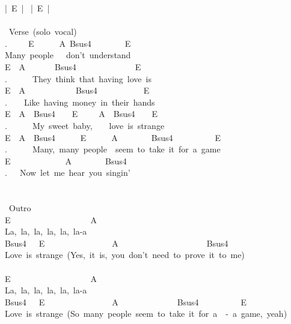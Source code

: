 {|\ E\ |\ %
|\ E\ |\ %
\\
\\
\lbrack\ Verse\rbrack\ (solo\ vocal)\\
.\ \ \ \ \ E\ \ \ \ \ \ A\ Bsus4\ \ \ \ \ \ \lbrack\ \ E\ \rbrack\\
Many\ people\ \ \ don't\ understand\\
E\ \ A\ \ \ \ \ \ \ Bsus4\ \ \ \ \ \ \ \ \ \ \ \ \lbrack\ \ E\ \rbrack\\
.\ \ \ \ \ \ They\ think\ that\ having\ love\ is\ \\
E\ \ A\ \ \ \ \ \ \ \ \ \ \ \ Bsus4\ \ \ \ \ \ \ \ \ \lbrack\ \ E\ \rbrack\\
.\ \ \ \ Like\ having\ money\ in\ their\ hands\\
E\ \ A\ \ Bsus4\ \ \ \ E\ \ \ \ \ A\ \ Bsus4\ \ \lbrack\ \ E\ \rbrack\\
.\ \ \ \ \ \ My\ sweet\ baby,\ \ \ \ love\ is\ strange\\
E\ \ A\ \ Bsus4\ \ \ \ \ \ E\ \ \ \ \ \ A\ \ \ \ \ \ \ \ Bsus4\ \ \ \ \ \ \ \ \lbrack\ \ E\ \rbrack\\
.\ \ \ \ \ \ Many,\ many\ people\ \ seem\ to\ take\ it\ for\ a\ game\\
E\ \ \ \ \ \ \ \ \ \ \ \ \ A\ \ \ \ \ \ \ \ Bsus4\\
.\ \ \ Now\ let\ me\ hear\ you\ singin'\\
\\
\\
\lbrack\ Outro\rbrack\\
E\ \ \ \ \ \ \ \ \ \ \ \ \ \ \ \ \ \ \ A\\
La,\ la,\ la,\ la,\ la,\ la-a\\
Bsus4\ \ \ E\ \ \ \ \ \ \ \ \ \ \ \ \ \ \ \ A\ \ \ \ \ \ \ \ \ \ \ \ \ \ \ \ \ \ \ \ \ Bsus4\ \\
Love\ is\ strange\ (Yes,\ it\ is,\ you\ don't\ need\ to\ prove\ it\ to\ me)\ \\
\\
E\ \ \ \ \ \ \ \ \ \ \ \ \ \ \ \ \ \ \ A\\
La,\ la,\ la,\ la,\ la,\ la-a\\
Bsus4\ \ \ E\ \ \ \ \ \ \ \ \ \ \ \ \ \ \ \ A\ \ \ \ \ \ \ \ \ \ \ \ \ \ Bsus4\ \ \ \ \ \ \ \ \lbrack\ \ E\ \rbrack\\
Love\ is\ strange\ (So\ many\ people\ seem\ to\ take\ it\ for\ a\ \ -\ a\ game,\ yeah)\\
\\
}

